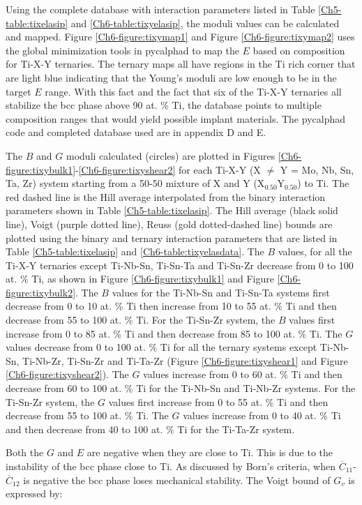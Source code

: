 Using the complete database with interaction parameters listed in Table \ref{Ch5-table:tixelasip} and \ref{Ch6-table:tixyelasip}, the moduli values can be calculated and mapped. Figure \ref{Ch6-figure:tixymap1} and Figure \ref{Ch6-figure:tixymap2} uses the global minimization tools in pycalphad \cite{Otis2017} to map the $E$ based on composition for Ti-X-Y ternaries. The ternary maps all have regions in the Ti rich corner that are light blue indicating that the Young's moduli are low enough to be in the target $E$ range. With this fact and the fact that six of the Ti-X-Y ternaries all stabilize the bcc phase above 90 at. \% Ti, the database points to multiple composition ranges that would yield possible implant materials. The pycalphad code and completed database used are in appendix D and E.

The $B$ and $G$ moduli calculated (circles) are plotted in Figures \ref{Ch6-figure:tixybulk1}-\ref{Ch6-figure:tixyshear2} for each Ti-X-Y (X $\neq$ Y = Mo, Nb, Sn, Ta, Zr) system starting from a 50-50 mixture of X and Y (X$_{0.50}$Y$_{0.50}$) to Ti. The red dashed line is the Hill average interpolated from the binary interaction parameters shown in Table \ref{Ch5-table:tixelasip}. The Hill average (black solid line), Voigt (purple dotted line), Reuss (gold dotted-dashed line) bounds are plotted using the binary and ternary interaction parameters that are listed in Table \ref{Ch5-table:tixelasip} and \ref{Ch6-table:tixyelasdata}. The $B$ values, for all the Ti-X-Y ternaries except Ti-Nb-Sn, Ti-Sn-Ta and Ti-Sn-Zr decrease from 0 to 100 at. \% Ti, as shown in Figure \ref{Ch6-figure:tixybulk1} and Figure \ref{Ch6-figure:tixybulk2}. The $B$ values for the Ti-Nb-Sn and Ti-Sn-Ta systems first decrease from 0 to 10 at. \% Ti then increase from 10 to 55 at. \% Ti and then decrease from 55 to 100 at. \% Ti. For the Ti-Sn-Zr system, the $B$ values first increase from 0 to 85 at. \% Ti and then decrease from 85 to 100 at. \% Ti. The $G$ values decrease from 0 to 100 at. \% Ti for all the ternary systems except Ti-Nb-Sn, Ti-Nb-Zr, Ti-Sn-Zr and Ti-Ta-Zr (Figure \ref{Ch6-figure:tixyshear1} and Figure \ref{Ch6-figure:tixyshear2}). The $G$ values increase from 0 to 60 at. \% Ti and then decrease from 60 to 100 at. \% Ti for the Ti-Nb-Sn and Ti-Nb-Zr systems. For the Ti-Sn-Zr system, the $G$ values first increase from 0 to 55 at. \% Ti and then decrease from 55 to 100 at. \% Ti. The $G$ values increase from 0 to 40 at. \% Ti and then decrease from 40 to 100 at. \% Ti for the Ti-Ta-Zr system. 

Both the $G$ and $E$ are negative when they are close to Ti. This is due to the instability of the bcc phase close to Ti. As discussed by Born's criteria, when $\overline{C}_{11}$-$\overline{C}_{12}$ is negative the bcc phase loses mechanical stability. The Voigt bound of $G_{v}$ is expressed by:

